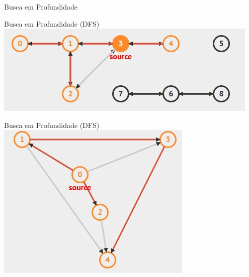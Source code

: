 \begin{frame}{Busca em Profundidade}
\end{frame}

\begin{frame}{Busca em Profundidade (DFS)}
\includegraphics[width=\linewidth]{img/dfs1.jpg}
\end{frame}

\begin{frame}{Busca em Profundidade (DFS)}
\includegraphics[width=\linewidth]{img/dfs2.jpg}
\end{frame}


